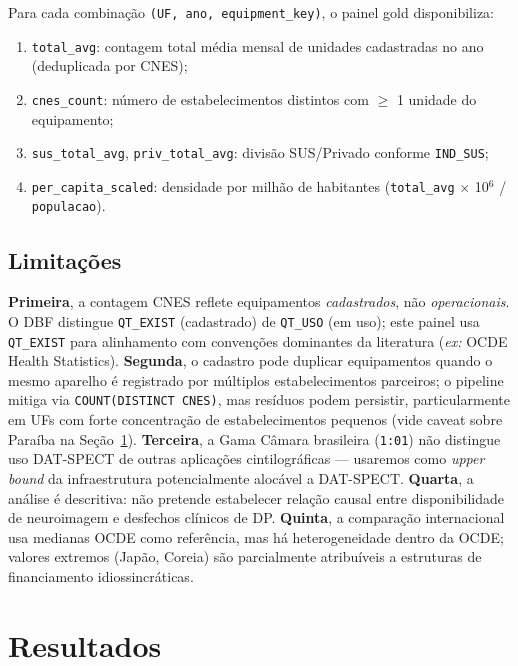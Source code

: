 \documentclass[12pt,a4paper,oneside]{article}
\begin{document}
Para cada combinação \texttt{(UF, ano, equipment\_key)}, o painel
gold disponibiliza:

\begin{enumerate}
\item \texttt{total\_avg}: contagem total média mensal de unidades
cadastradas no ano (deduplicada por CNES);
\item \texttt{cnes\_count}: número de estabelecimentos distintos com
$\geq$ 1 unidade do equipamento;
\item \texttt{sus\_total\_avg}, \texttt{priv\_total\_avg}: divisão
SUS/Privado conforme \texttt{IND\_SUS};
\item \texttt{per\_capita\_scaled}: densidade por milhão de
habitantes (\texttt{total\_avg} $\times$ 10$^{6}$ / \texttt{populacao}).
\end{enumerate}

\subsection{Limitações}

\textbf{Primeira}, a contagem CNES reflete equipamentos
\textit{cadastrados}, não \textit{operacionais}. O DBF distingue
\texttt{QT\_EXIST} (cadastrado) de \texttt{QT\_USO} (em uso); este
painel usa \texttt{QT\_EXIST} para alinhamento com convenções
dominantes da literatura (\textit{ex:} OCDE Health Statistics).
\textbf{Segunda}, o cadastro pode duplicar equipamentos quando o
mesmo aparelho é registrado por múltiplos estabelecimentos parceiros;
o pipeline mitiga via \texttt{COUNT(DISTINCT CNES)}, mas resíduos
podem persistir, particularmente em UFs com forte concentração de
estabelecimentos pequenos (vide caveat sobre Paraíba na
Seção~\ref{sec:resultados}). \textbf{Terceira}, a Gama Câmara
brasileira (\texttt{1:01}) não distingue uso DAT-SPECT de outras
aplicações cintilográficas — usaremos como \textit{upper bound} da
infraestrutura potencialmente alocável a DAT-SPECT. \textbf{Quarta}, a
análise é descritiva: não pretende estabelecer relação causal entre
disponibilidade de neuroimagem e desfechos clínicos de DP.
\textbf{Quinta}, a comparação internacional usa medianas OCDE como
referência, mas há heterogeneidade dentro da OCDE; valores extremos
(Japão, Coreia) são parcialmente atribuíveis a estruturas de
financiamento idiossincráticas.

\section{Resultados}\label{sec:resultados}
\end{document}
